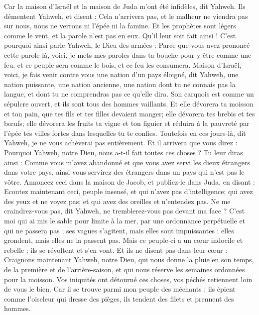\begin{multicols}{2}
Car la maison d'Israël et la maison de Juda m'ont été infidèles, dit Yahweh.
Ils démentent Yahweh, et disent : Cela n'arrivera pas, et le malheur ne viendra pas sur nous, nous ne verrons ni l'épée ni la famine.
Et les prophètes sont légers comme le vent, et la parole n'est pas en eux. Qu'il leur soit fait ainsi !
C'est pourquoi ainsi parle Yahweh, le Dieu des armées : Parce que vous avez prononcé cette parole-là, voici, je mets mes paroles dans ta bouche pour y être comme une feu, et ce peuple sera comme le bois, et ce feu les consumera.
Maison d'Israël, voici, je fais venir contre vous une nation d'un pays éloigné, dit Yahweh, une nation puissante, une nation ancienne, une nation dont tu ne connais pas la langue, et dont tu ne comprendras pas ce qu'elle dira.
Son carquois est comme un sépulcre ouvert, et ils sont tous des hommes vaillants.
Et elle dévorera ta moisson et ton pain, que tes fils et tes filles devaient manger; elle dévorera tes brebis et tes bœufs; elle dévorera les fruits ta vigne et ton figuier et réduira à la pauvreté par l'épée tes villes fortes dans lesquelles tu te confies.
Toutefois en ces jours-là, dit Yahweh, je ne vous achèverai pas entièrement.
Et il arrivera que vous direz : Pourquoi Yahweh, notre Dieu, nous a-t-il fait toutes ces choses ? Tu leur diras ainsi : Comme vous m'avez abandonné et que vous avez servi les dieux étrangers dans votre pays, ainsi vous servirez des étrangers dans un pays qui n'est pas le vôtre.
Annoncez ceci dans la maison de Jacob, et publiez-le dans Juda, en disant :
Ecoutez maintenant ceci, peuple insensé, et qui n'avez pas d'intelligence; qui avez des yeux et ne voyez pas; et qui avez des oreilles et n'entendez pas.
Ne me craindrez-vous pas, dit Yahweh, ne tremblerez-vous pas devant ma face ? C'est moi qui ai mis le sable pour limite à la mer, par une ordonnance perpétuelle et qui ne passera pas ; ses vagues s'agitent, mais elles sont impuissantes ; elles grondent, mais elles ne la passent pas.
Mais ce peuple-ci a un cœur indocile et rebelle ; ils se révoltent et s'en vont.
Et ils ne disent pas dans leur cœur : Craignons maintenant Yahweh, notre Dieu, qui nous donne la pluie en son temps, de la première et de l'arrière-saison, et qui nous réserve les semaines ordonnées pour la moisson.
Vos iniquités ont détourné ces choses, vos péchés retiennent loin de vous le bien.
Car il se trouve parmi mon peuple des méchants ; ils épient comme l'oiseleur qui dresse des pièges, ils tendent des filets et prennent des hommes.

\end{multicols}
